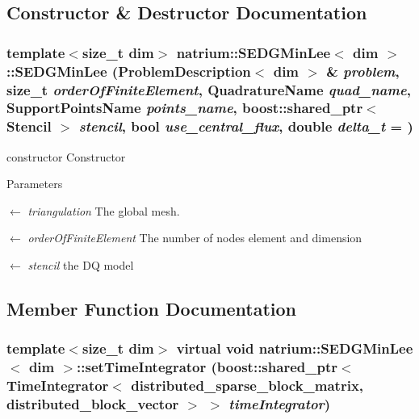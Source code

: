 \subsection{Constructor \& Destructor Documentation}
\hypertarget{classnatrium_1_1SEDGMinLee_a774e2c04bcb9ef8f8c900b4ffaf140ec}{
\subsubsection[{SEDGMinLee}]{\setlength{\rightskip}{0pt plus 5cm}template$<$size\_\-t dim$>$ {\bf natrium::SEDGMinLee}$<$ dim $>$::{\bf SEDGMinLee} ({\bf ProblemDescription}$<$ dim $>$ \& {\em problem}, \/  size\_\-t {\em orderOfFiniteElement}, \/  QuadratureName {\em quad\_\-name}, \/  SupportPointsName {\em points\_\-name}, \/  boost::shared\_\-ptr$<$ {\bf Stencil} $>$ {\em stencil}, \/  bool {\em use\_\-central\_\-flux}, \/  double {\em delta\_\-t} = {})}}
\label{classnatrium_1_1SEDGMinLee_a774e2c04bcb9ef8f8c900b4ffaf140ec}


constructor Constructor 
\begin{DoxyParams}{Parameters}
\item[\mbox{$\leftarrow$} {\em triangulation}]The global mesh. \item[\mbox{$\leftarrow$} {\em orderOfFiniteElement}]The number of nodes element and dimension \item[\mbox{$\leftarrow$} {\em stencil}]the DQ model \end{DoxyParams}


\subsection{Member Function Documentation}
\hypertarget{classnatrium_1_1SEDGMinLee_add96facb8df190a139505ea912bb1a75}{
\subsubsection[{setTimeIntegrator}]{\setlength{\rightskip}{0pt plus 5cm}template$<$size\_\-t dim$>$ virtual void {\bf natrium::SEDGMinLee}$<$ dim $>$::setTimeIntegrator (boost::shared\_\-ptr$<$ {\bf TimeIntegrator}$<$ distributed\_\-sparse\_\-block\_\-matrix, distributed\_\-block\_\-vector $>$ $>$ {\em timeIntegrator})}}
\label{classnatrium_1_1SEDGMinLee_add96facb8df190a139505ea912bb1a75}


